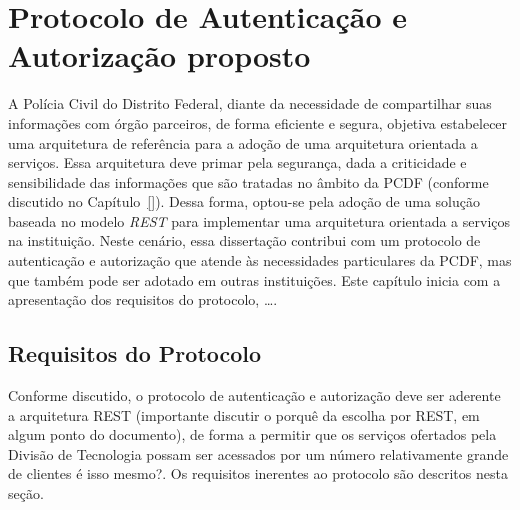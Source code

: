 \chapter{Protocolo de Autenticação e Autorização proposto}\label{cap:Protocolo}



A Polícia Civil do Distrito Federal, diante da necessidade de compartilhar suas informações com órgão parceiros, de forma eficiente e segura, 
objetiva estabelecer uma arquitetura de referência para a adoção de uma arquitetura orientada a servi\c cos. Essa arquitetura deve primar pela segurança, 
dada a criticidade e sensibilidade das informações que são tratadas no âmbito da PCDF ({\color{red}conforme discutido no Cap\'{i}tulo~\ref{}}).
Dessa forma, optou-se pela ado\c c\~{a}o de uma solu\c c\~{a}o {\color{red}baseada no modelo \emph{REST}} para implementar uma arquitetura orientada a servi\c cos 
na instituição. Neste cen\'{a}rio, essa disserta\c c\~{a}o contribui com um protocolo de autenticação e autorização que atende às 
necessidades particulares da PCDF, mas que tamb\'{e}m pode ser adotado em outras institui\c c\~{o}es. {\color{red}Este cap\'{i}tulo inicia com a apresenta\c c\~{a}o 
dos requisitos do protocolo, \ldots}.

\section{Requisitos do Protocolo}\label{sec:reqprotocolo}

Conforme discutido, o protocolo de autenticação e autorização deve ser aderente a arquitetura REST ({\color{blue}importante discutir o porqu\^{e} da escolha por REST, em algum ponto do documento}), de forma a permitir que os serviços ofertados pela Divisão de Tecnologia possam ser acessados por um número relativamente grande de clientes {\color{red}\'{e} isso mesmo?}. 
Os requisitos inerentes ao protocolo são descritos nesta seção.

